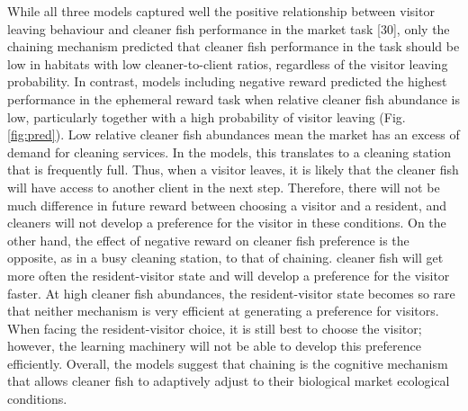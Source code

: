\documentclass[10pt,letterpaper]{article}
\begin{document}
While all three models captured well the positive relationship between
visitor leaving behaviour and cleaner fish performance in the market
task {[}30{]}, only the chaining mechanism predicted that cleaner fish
performance in the task should be low in habitats with low
cleaner-to-client ratios, regardless of the visitor leaving probability.
In contrast, models including negative reward predicted the highest
performance in the ephemeral reward task when relative cleaner fish
abundance is low, particularly together with a high probability of
visitor leaving (Fig. \ref{fig:pred}). Low relative cleaner fish
abundances mean the market has an excess of demand for cleaning
services. In the models, this translates to a cleaning station that is
frequently full. Thus, when a visitor leaves, it is likely that the
cleaner fish will have access to another client in the next step.
Therefore, there will not be much difference in future reward between
choosing a visitor and a resident, and cleaners will not develop a
preference for the visitor in these conditions. On the other hand, the
effect of negative reward on cleaner fish preference is the opposite, as
in a busy cleaning station, to that of chaining. cleaner fish will get
more often the resident-visitor state and will develop a preference for
the visitor faster. At high cleaner fish abundances, the
resident-visitor state becomes so rare that neither mechanism is very
efficient at generating a preference for visitors. When facing the
resident-visitor choice, it is still best to choose the visitor;
however, the learning machinery will not be able to develop this
preference efficiently. Overall, the models suggest that chaining is the
cognitive mechanism that allows cleaner fish to adaptively adjust to
their biological market ecological conditions.
\end{document}
